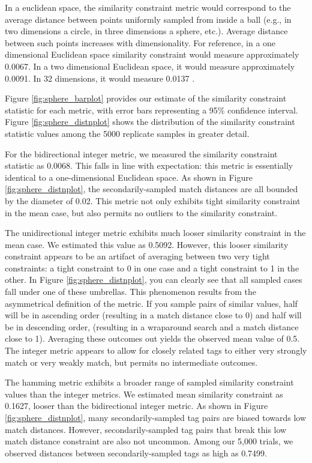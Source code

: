 

In a euclidean space, the similarity constraint metric would correspond to the average distance between points uniformly sampled from inside a ball (e.g., in two dimensions a circle, in three dimensions a sphere, etc.).
Average distance between such points increases with dimensionality.
For reference, in a one dimensional Euclidean space similarity constraint would measure approximately 0.0067.
In a two dimensional Euclidean space, it would measure approximately  0.0091.
In 32 dimensions, it would measure 0.0137 \citep{dunbar1997average}.

Figure \ref{fig:sphere_barplot} provides our estimate of the similarity constraint statistic for each metric, with error bars representing a 95\% confidence interval.
Figure \ref{fig:sphere_distnplot} shows the distribution of the similarity constraint statistic values among the 5000 replicate samples in greater detail.

For the bidirectional integer metric, we measured the similarity constraint statistic as 0.0068.
This falls in line with expectation: this metric is essentially identical to a one-dimensional Euclidean space.
As shown in Figure \ref{fig:sphere_distnplot}, the secondarily-sampled match distances are all bounded by the diameter of 0.02.
This metric not only exhibits tight similarity constraint in the mean case, but also permits no outliers to the similarity constraint.

The unidirectional integer metric exhibits much looser similarity constraint in the mean case.
We estimated this value as 0.5092.
However, this looser similarity constraint appears to be an artifact of averaging between two very tight constraints: a tight constraint to 0 in one case and a tight constraint to 1 in the other.
In Figure \ref{fig:sphere_distnplot}, you can clearly see that all sampled cases fall under one of these umbrellas.
This phenomenon results from the asymmetrical definition of the metric.
If you sample pairs of similar values, half will be in ascending order (resulting in a match distance close to 0) and half will be in descending order, (resulting in a wraparound search and a match distance close to 1).
Averaging these outcomes out yields the observed mean value of 0.5.
The integer metric appears to allow for closely related tags to either very strongly match or very weakly match, but permits no intermediate outcomes.

The hamming metric exhibits a broader range of sampled similarity constraint values than the integer metrics.
We estimated mean similarity constraint as 0.1627, looser than the bidirectional integer metric.
As shown in Figure \ref{fig:sphere_distnplot}, many secondarily-sampled tag pairs are biased towards low match distances.
However, secondarily-sampled tag pairs that break this low match distance constraint are also not uncommon.
Among our 5,000 trials, we observed distances between secondarily-sampled tags as high as 0.7499.

